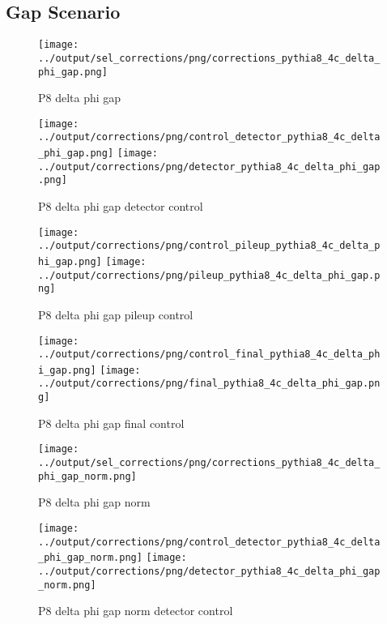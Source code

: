 \documentclass[11pt]{book}
\begin{document}
\clearpage
\subsection{Gap Scenario}


\begin{figure}[ht]
\centering
\texttt{[image: ../output/sel\_corrections/png/corrections\_pythia8\_4c\_delta\_phi\_gap.png]}
\caption{P8 delta phi gap}
\label{fig:p8_delta_phi_gap}
\end{figure}

\begin{figure}[ht]
\centering
\texttt{[image: ../output/corrections/png/control\_detector\_pythia8\_4c\_delta\_phi\_gap.png]}
\texttt{[image: ../output/corrections/png/detector\_pythia8\_4c\_delta\_phi\_gap.png]}
\caption{P8 delta phi gap detector control}
\label{fig:p8_delta_phi_gap_detector_control}
\end{figure}

\begin{figure}[ht]
\centering
\texttt{[image: ../output/corrections/png/control\_pileup\_pythia8\_4c\_delta\_phi\_gap.png]}
\texttt{[image: ../output/corrections/png/pileup\_pythia8\_4c\_delta\_phi\_gap.png]}
\caption{P8 delta phi gap pileup control}
\label{fig:p8_delta_phi_gap_pileup_control}
\end{figure}


\begin{figure}[ht]
\centering
\texttt{[image: ../output/corrections/png/control\_final\_pythia8\_4c\_delta\_phi\_gap.png]}
\texttt{[image: ../output/corrections/png/final\_pythia8\_4c\_delta\_phi\_gap.png]}
\caption{P8 delta phi gap final control}
\label{fig:p8_delta_phi_gap_final_control}
\end{figure}


\begin{figure}[ht]
\centering
\texttt{[image: ../output/sel\_corrections/png/corrections\_pythia8\_4c\_delta\_phi\_gap\_norm.png]}
\caption{P8 delta phi gap norm}
\label{fig:p8_delta_phi_gap_norm}
\end{figure}

\begin{figure}[ht]
\centering
\texttt{[image: ../output/corrections/png/control\_detector\_pythia8\_4c\_delta\_phi\_gap\_norm.png]}
\texttt{[image: ../output/corrections/png/detector\_pythia8\_4c\_delta\_phi\_gap\_norm.png]}
\caption{P8 delta phi gap norm detector control}
\label{fig:p8_delta_phi_gap_norm_detector_control}
\end{figure}
\end{document}
